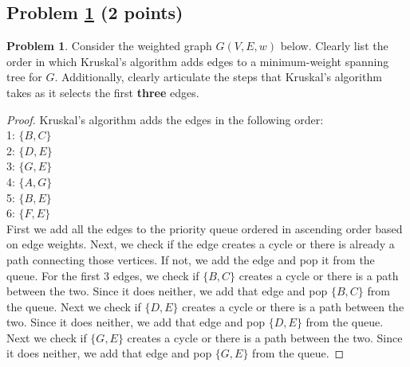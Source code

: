 \documentclass[11pt]{article}
\theoremstyle{definition}
\theoremstyle{definition}
\newtheorem{required}{Problem}
\theoremstyle{definition}
\begin{document}
\subsection{Problem \ref{MST_Kruskal} (2 points)}
\begin{required} \label{MST_Kruskal}
Consider the weighted graph $G(V, E, w)$ below. Clearly list the order in which Kruskal's algorithm adds edges to a minimum-weight spanning tree for $G$. Additionally, clearly articulate the steps that Kruskal's algorithm takes as it selects the first \textbf{three} edges.


\begin{center}
\end{center}
\end{required}

\begin{proof}
Kruskal's algorithm adds the edges in the following order:\\
1: $\{B, C\}$\\
2: $\{D, E\}$\\
3: $\{G, E\}$\\
4: $\{A, G\}$\\
5: $\{B, E\}$\\
6: $\{F, E\}$\\

First we add all the edges to the priority queue ordered in ascending order based on edge weights. Next, we check if the edge creates a cycle or there is already a path connecting those vertices. If not, we add the edge and pop it from the queue. For the first 3 edges, we check if $\{B, C\}$ creates a cycle or there is a path between the two. Since it does neither, we add that edge and pop $\{B, C\}$ from the queue. Next we check if $\{D, E\}$ creates a cycle or there is a path between the two. Since it does neither, we add that edge and pop $\{D, E\}$ from the queue. Next we check if $\{G, E\}$ creates a cycle or there is a path between the two. Since it does neither, we add that edge and pop $\{G, E\}$ from the queue.
\end{proof}
\end{document}
